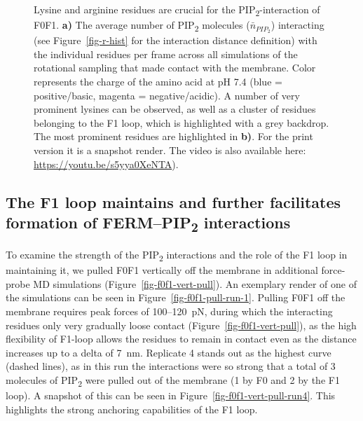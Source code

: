 \documentclass[
  twocolumn]{biophys-new-mod}
\begin{document}
\begin{figure}
\begin{minipage}[t]{\linewidth}
{}

\subcaption{\label{fig-f1f1-residues}~}
\end{minipage}%

\caption{\label{fig-f0f1-residues}Lysine and arginine residues are
crucial for the PIP\textsubscript{2}-interaction of F0F1. \textbf{a)}
The average number of PIP\textsubscript{2} molecules
(\(\bar n_{PIP_2}\)) interacting (see Figure~\ref{fig-r-hist} for the
interaction distance definition) with the individual residues per frame
across all simulations of the rotational sampling that made contact with
the membrane. Color represents the charge of the amino acid at pH 7.4
(blue = positive/basic, magenta = negative/acidic). A number of very
prominent lysines can be observed, as well as a cluster of residues
belonging to the F1 loop, which is highlighted with a grey backdrop. The
most prominent residues are highlighted in \textbf{b)}. For the print
version it is a snapshot render. The video is also available here:
\url{https://youtu.be/s5yya0XeNTA}).}

\end{figure}

\hypertarget{the-f1-loop-maintains-and-further-facilitates-formation-of-fermpip2-interactions}{%
\subsection{\texorpdfstring{The F1 loop maintains and further
facilitates formation of FERM--PIP\textsubscript{2}
interactions}{The F1 loop maintains and further facilitates formation of FERM--PIP2 interactions}}\label{the-f1-loop-maintains-and-further-facilitates-formation-of-fermpip2-interactions}}

To examine the strength of the PIP\textsubscript{2} interactions and the
role of the F1 loop in maintaining it, we pulled F0F1 vertically off the
membrane in additional force-probe MD simulations
(Figure~\ref{fig-f0f1-vert-pull}). An exemplary render of one of the
simulations can be seen in Figure~\ref{fig-f0f1-pull-run-1}. Pulling
F0F1 off the membrane requires peak forces of 100--120~pN, during which
the interacting residues only very gradually loose contact
(Figure~\ref{fig-f0f1-vert-pull}), as the high flexibility of F1-loop
allows the residues to remain in contact even as the distance increases
up to a delta of 7~nm. Replicate 4 stands out as the highest curve
(dashed lines), as in this run the interactions were so strong that a
total of 3 molecules of PIP\textsubscript{2} were pulled out of the
membrane (1 by F0 and 2 by the F1 loop). A snapshot of this can be seen
in Figure~\ref{fig-f0f1-vert-pull-run4}. This highlights the strong
anchoring capabilities of the F1 loop.
\end{document}
